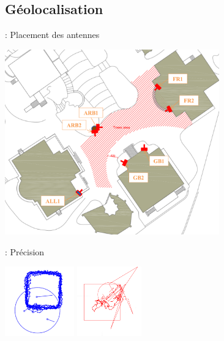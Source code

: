 \documentclass[12pt]{beamer}
\begin{document}
        \subsection{Géolocalisation}
            \begin{frame}{\subsecname: Placement des antennes}
                \vspace{-0.4cm}
                \begin{center}
                    \includegraphics[height=8cm]{img/antennes.png}
                \end{center}
            \end{frame}
            \begin{frame}{\subsecname: Précision}
                \begin{center}
                    \includegraphics[height=3cm]{img/carre_ok.png} \pause
                    \includegraphics[height=3cm]{img/carre_ko.png}
                \end{center}
            \end{frame}
\end{document}
